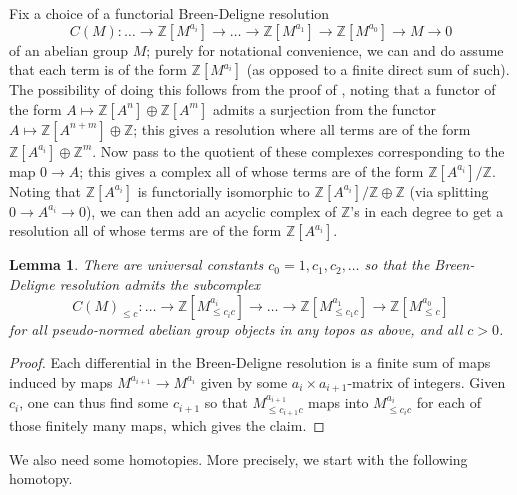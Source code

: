 \documentclass[11pt]{amsart}
\numberwithin{equation}{section}
\numberwithin{theorem}{section}
\newtheorem{lemma}[theorem]{Lemma}
\theoremstyle{definition}
\begin{document}
Fix a choice of a functorial Breen-Deligne resolution
\[
C(M):\ldots \to \mathbb Z[M^{a_i}]\to\ldots\to\mathbb
Z[M^{a_1}]\to\mathbb Z[M^{a_0}]\to M\to 0
\]
of an abelian group $M$; purely for notational convenience, we can and do assume that each term is of the form $\mathbb Z[M^{a_i}]$ (as opposed to a finite direct sum of such). The possibility of doing this follows from the proof of \cite[Theorem 4.10]{Condensed}, noting that a functor of the form $A\mapsto \mathbb Z[A^n]\oplus \mathbb Z[A^m]$ admits a surjection from the functor $A\mapsto \mathbb Z[A^{n+m}]\oplus \mathbb Z$; this gives a resolution where all terms are of the form $\mathbb Z[A^{a_i}]\oplus \mathbb Z^m$. Now pass to the quotient of these complexes corresponding to the map $0\to A$; this gives a complex all of whose terms are of the form $\mathbb Z[A^{a_i}]/\mathbb Z$. Noting that $\mathbb Z[A^{a_i}]$ is functorially isomorphic to $\mathbb Z[A^{a_i}]/\mathbb Z\oplus \mathbb Z$ (via splitting $0\to A^{a_i}\to 0$), we can then add an acyclic complex of $\mathbb Z$'s in each degree to get a resolution all of whose terms are of the form $\mathbb Z[A^{a_i}]$.

\begin{lemma}\label{lem:constantsdeligne} There are universal constants $c_0=1,c_1,c_2,\ldots$ so that the Breen-Deligne resolution admits the subcomplex
\[
C(M)_{\leq c}: \ldots \to \mathbb Z[M^{a_i}_{\leq c_ic}]\to\ldots\to\mathbb
Z[M^{a_1}_{\leq c_1c}]\to\mathbb Z[M^{a_0}_{\leq c}]
\]
for all pseudo-normed abelian group objects in any topos as above, and all $c>0$.
\end{lemma}

\begin{proof} Each differential in the Breen-Deligne resolution is a finite sum of maps induced by maps $M^{a_{i+1}}\to M^{a_i}$ given by some $a_i\times a_{i+1}$-matrix of integers. Given $c_i$, one can thus find some $c_{i+1}$ so that $M^{a_{i+1}}_{\leq c_{i+1}c}$ maps into $M^{a_i}_{\leq c_ic}$ for each of those finitely many maps, which gives the claim.
\end{proof}

We also need some homotopies. More precisely, we start with the following homotopy.
\end{document}
